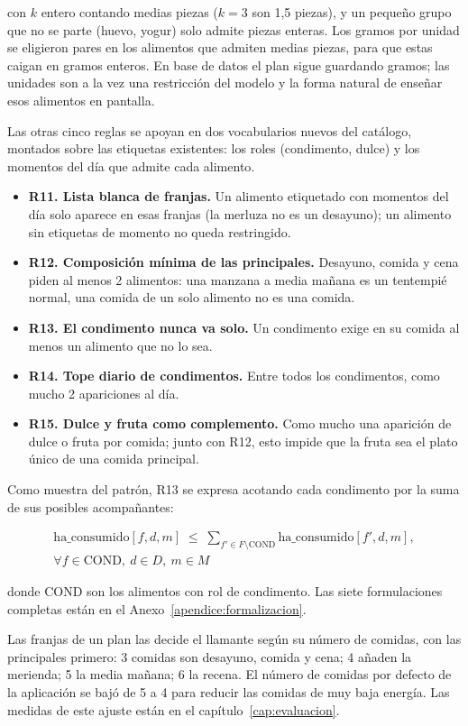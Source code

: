 con $k$ entero contando medias piezas ($k = 3$ son 1,5 piezas), y un pequeño grupo que no se parte (huevo, yogur) solo admite piezas enteras. Los gramos por unidad se eligieron pares en los alimentos que admiten medias piezas, para que estas caigan en gramos enteros. En base de datos el plan sigue guardando gramos; las unidades son a la vez una restricción del modelo y la forma natural de enseñar esos alimentos en pantalla.

Las otras cinco reglas se apoyan en dos vocabularios nuevos del catálogo, montados sobre las etiquetas existentes: los roles (condimento, dulce) y los momentos del día que admite cada alimento.

\begin{itemize}
    \item \textbf{R11. Lista blanca de franjas.} Un alimento etiquetado con momentos del día solo aparece en esas franjas (la merluza no es un desayuno); un alimento sin etiquetas de momento no queda restringido.
    \item \textbf{R12. Composición mínima de las principales.} Desayuno, comida y cena piden al menos 2 alimentos: una manzana a media mañana es un tentempié normal, una comida de un solo alimento no es una comida.
    \item \textbf{R13. El condimento nunca va solo.} Un condimento exige en su comida al menos un alimento que no lo sea.
    \item \textbf{R14. Tope diario de condimentos.} Entre todos los condimentos, como mucho 2 apariciones al día.
    \item \textbf{R15. Dulce y fruta como complemento.} Como mucho una aparición de dulce o fruta por comida; junto con R12, esto impide que la fruta sea el plato único de una comida principal.
\end{itemize}

Como muestra del patrón, R13 se expresa acotando cada condimento por la suma de sus posibles acompañantes:

\begin{gather*}
\text{ha\_consumido}[f,d,m] \;\le\; \sum_{f' \in F \setminus \text{COND}} \text{ha\_consumido}[f',d,m], \\
\forall f \in \text{COND},\ d \in D,\ m \in M
\end{gather*}

donde COND son los alimentos con rol de condimento. Las siete formulaciones completas están en el Anexo~\ref{apendice:formalizacion}.

Las franjas de un plan las decide el llamante según su número de comidas, con las principales primero: 3 comidas son desayuno, comida y cena; 4 añaden la merienda; 5 la media mañana; 6 la recena. El número de comidas por defecto de la aplicación se bajó de 5 a 4 para reducir las comidas de muy baja energía. Las medidas de este ajuste están en el capítulo~\ref{cap:evaluacion}.


